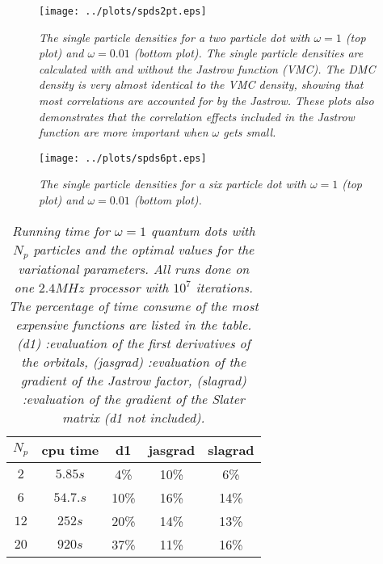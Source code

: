 \documentclass[a4paper,10pt,twocolumn]{article} %
\begin{document}
\begin{figure}[h!]
\begin{center}
\caption{{\it%
		The single particle densities for a two particle dot with $\omega=1$ (top plot) and $\omega=0.01$ (bottom plot). 
		The single particle densities are calculated with and without the Jastrow function (VMC). The DMC density is very almost identical to the VMC density, showing that most 
		correlations are accounted for by the Jastrow. These plots also demonstrates that the correlation effects 
		included in the Jastrow function are more important when $\omega$ gets small. 
		}}
		\label{fig:spd2}
\vspace{.1cm}
	\texttt{[image: ../plots/spds2pt.eps]}
\end{center}
\end{figure}

\begin{figure}[h!]
\begin{center}
\caption{{\it%
		The single particle densities for a six particle dot with $\omega=1$ (top plot) and $\omega=0.01$ (bottom plot). 
		}}
		\label{fig:spd6}
\vspace{.1cm}
	\texttt{[image: ../plots/spds6pt.eps]}
\end{center}
\end{figure}

\begin{table}[h!]
\begin{center}
\begin{tabular}{|c|c|c|c|c|}
\hline
$N_{p}$ & cpu time & d1  & jasgrad  & slagrad  \\ 
\hline
\hline
 $2$  & $5.85s$ &4\% &10\% &6\%\\ 
 $6$  & $54.7.s$ & 10\% &16\% &14\%\\ 
 $12$ & $252s$ & 20\% &14\% &13\%\\ 
 $20$ & $920s$ & 37\% &11\% &16\%\\ 
\hline
\end{tabular}
\end{center}
\caption{{\it 
	Running time for $\omega=1$ quantum dots with $N_p$ particles and the optimal values for the variational parameters. All runs done on one $2.4 MHz$ processor with $10^7$ iterations.
	The percentage of time consume of the most expensive functions are listed in the table. 
	(d1) :evaluation of the first derivatives of the orbitals,
	(jasgrad)  :evaluation of the gradient of the Jastrow factor,
	(slagrad)  :evaluation of the gradient of the Slater matrix (d1 not included).
}}
\label{tab:scaletime}
\end{table}
\end{document}

